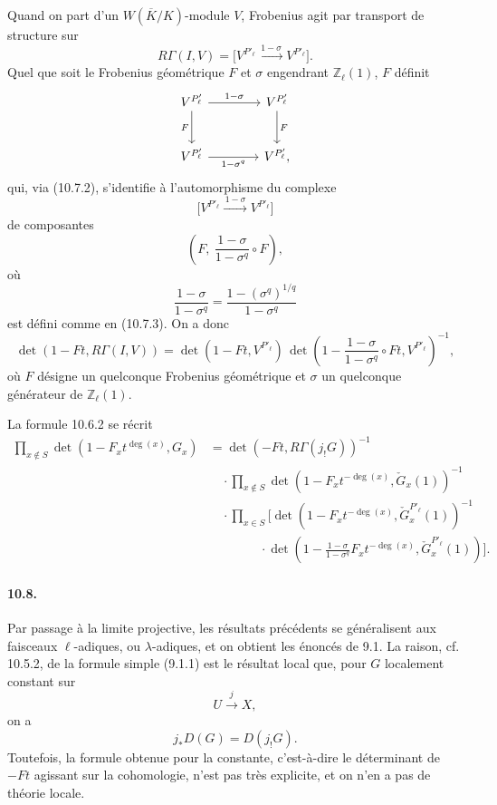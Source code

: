 \documentclass[10pt]{article}
\newcommand{\Z}{\mathbb Z}
\begin{document}
\begin{enumerate}[label=(\alph*)]
Quand on part d'un \(W(\overline K/K)\)-module \(V\), Frobenius agit par transport de structure sur
\[
R\Gamma(I,V)=
\bigl[V^{P'_\ell}\xrightarrow{\,1-\sigma\,}V^{P'_\ell}\bigr].
\]
Quel que soit le Frobenius géométrique \(F\) et \(\sigma\) engendrant \(\Z_\ell(1)\), \(F\) définit
\[
\begin{tikzcd}[column sep=4.0em,row sep=2.6em]
V^{P'_\ell}\arrow[r,"1-\sigma"]\arrow[d,"F"']&
V^{P'_\ell}\arrow[d,"F"]\\
V^{P'_\ell}\arrow[r,"1-\sigma^q"']&
V^{P'_\ell},
\end{tikzcd}
\]
qui, via (10.7.2), s'identifie à l'automorphisme du complexe
\[
\bigl[V^{P'_\ell}\xrightarrow{\,1-\sigma\,}V^{P'_\ell}\bigr]
\]
de composantes
\[
\left(F,\ \frac{1-\sigma}{1-\sigma^q}\circ F\right),
\]
où
\[
\frac{1-\sigma}{1-\sigma^q}
=
\frac{1-(\sigma^q)^{1/q}}{1-\sigma^q}
\]
est défini comme en (10.7.3). On a donc
\[
\det(1-Ft,R\Gamma(I,V))
=
\det(1-Ft,V^{P'_\ell})\,
\det\!\left(1-\frac{1-\sigma}{1-\sigma^q}\circ Ft,V^{P'_\ell}\right)^{-1},
\]
où \(F\) désigne un quelconque Frobenius géométrique et \(\sigma\) un quelconque générateur de \(\Z_\ell(1)\).

La formule 10.6.2 se récrit
\[
\tag{10.7.4}
\begin{aligned}
\prod_{x\notin S}\det(1-F_xt^{\deg(x)},G_x)
&=\det(-Ft,R\Gamma(j_!G))^{-1}\\
&\quad\cdot
\prod_{x\notin S}\det(1-F_xt^{-\deg(x)},\check G_x(1))^{-1}\\
&\quad\cdot
\prod_{x\in S}\Biggl[
\det(1-F_xt^{-\deg(x)},\check G_x^{P'_\ell}(1))^{-1}\\
&\qquad\qquad\cdot
\det\!\left(1-\frac{1-\sigma}{1-\sigma^q}F_xt^{-\deg(x)},\check G_x^{P'_\ell}(1)\right)
\Biggr].
\end{aligned}
\]

\end{enumerate}

\paragraph{10.8.} Par passage à la limite projective, les résultats précédents se généralisent aux faisceaux \(\ell\)-adiques, ou \(\lambda\)-adiques, et on obtient les énoncés de 9.1. La raison, cf. 10.5.2, de la formule simple (9.1.1) est le résultat local que, pour \(G\) localement constant sur
\[
U\xrightarrow{j}X,
\]
on a
\[
j_*D(G)=D(j_!G).
\]
Toutefois, la formule obtenue pour la constante, c'est-à-dire le déterminant de \(-Ft\) agissant sur la cohomologie, n'est pas très explicite, et on n'en a pas de théorie locale.
\end{document}
